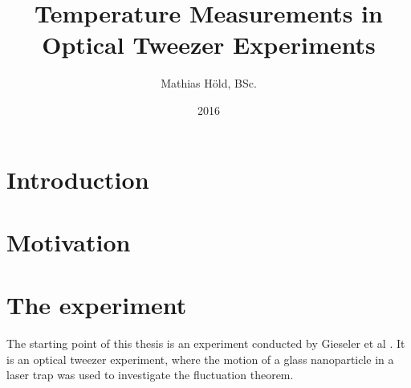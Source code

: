 \documentclass[12pt]{article}
\begin{document}
\title{Temperature Measurements in Optical Tweezer Experiments}
\author{Mathias H\"old, BSc.}
\date{2016}
\maketitle
\thispagestyle{empty}
\newpage
\section{Introduction}





\newpage
\section{Motivation}
\section{The experiment}
The starting point of this thesis is an experiment conducted by Gieseler et al \cite{Gieseler2014}. It is an optical tweezer experiment, where the
motion of a glass nanoparticle in a laser trap was used to investigate the fluctuation theorem\cite{Crooks1999}.
\end{document}
